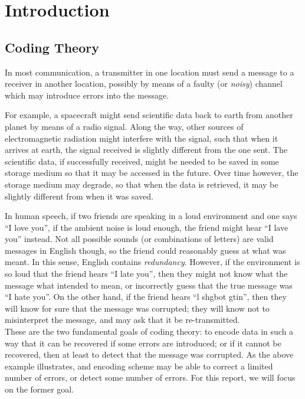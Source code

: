\documentclass{report}
\begin{document}
\tableofcontents

\chapter{Introduction}\label{ch:intro}
  \section{Coding Theory}\label{sec:intro:coding}
    In most communication, a transmitter in one location must send a message to
    a receiver in another location, possibly by means of a faulty (or
    \textit{noisy}) channel which may introduce errors into the message.

    For example, a spacecraft might send scientific data back to earth from
    another planet by means of a radio signal.  Along the way, other sources of
    electromagnetic radiation might interfere with the signal, such that when it
    arrives at earth, the signal received is slightly different from the one
    sent.
    The scientific data, if successfully received, might be needed to be saved in
    some storage medium so that it may be accessed in the future.  Over time
    however, the storage medium may degrade, so that when the data is retrieved,
    it may be slightly different from when it was saved.

    In human speech, if two friends are speaking in a loud environment and one
    says ``I love you'', if the ambient noise is loud enough, the friend might
    hear ``I lave you'' instead.  Not all possible sounds (or combinations of
    letters) are valid messages in English though, so the friend could
    reasonably guess at what was meant.  In this sense, English contains
    \textit{redundancy}.  However, if the environment is so loud that the friend
    hears ``I late you'', then they might not know what the message what
    intended to mean, or incorrectly guess that the true message was ``I hate
    you''.  On the other hand, if the friend hears ``l shgbot gtin'', then they
    will know for sure that the message was corrupted; they will know not to
    misinterpret the message, and may ask that it be re-transmitted.
    \\

    These are the two fundamental goals of coding theory: to encode data in such
    a way that it can be recovered if some errors are introduced; or if it
    cannot be recovered, then at least to detect that the message was corrupted.
    As the above example illustrates, and encoding scheme may be able to correct
    a limited number of errors, or detect some number of errors.  For this
    report, we will focus on the former goal.
\end{document}

